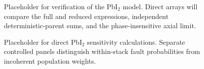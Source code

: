 \begin{figure}[!htbp]
  \centering
  \caption{Placeholder for verification of the PbI$_2$ model. Direct arrays will compare the full and reduced expressions, independent deterministic-parent sums, and the phase-insensitive axial limit.}
  \label{fig:si_pbi2_transition_validation}
\end{figure}


\begin{figure}[!htbp]
  \centering
  \caption{Placeholder for direct PbI$_2$ sensitivity calculations. Separate controlled panels distinguish within-stack fault probabilities from incoherent population weights.}
  \label{fig:si_pbi2_sensitivity}
\end{figure}
